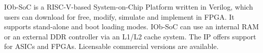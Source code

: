 %

IOb-SoC is a RISC-V-based System-on-Chip Platform written in Verilog, which
users can download for free, modify, simulate and implement in FPGA. It supports
stand-alone and boot loading modes. IOb-SoC can use an internal RAM or an
external DDR controller via an L1/L2 cache system. The IP offers support for
ASICs and FPGAs. Licensable commercial versions are available.
